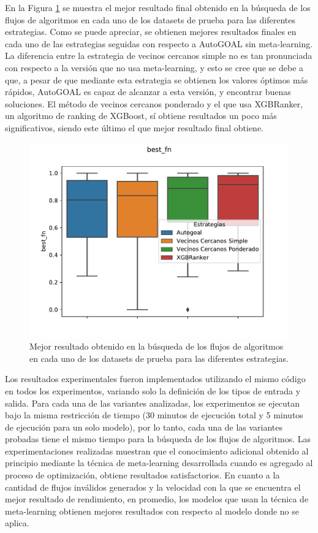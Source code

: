 En la Figura \ref{fig:bestfn} se muestra el mejor resultado final obtenido en la búsqueda de los flujos de algoritmos en cada uno de los datasets de prueba para las diferentes estrategias. Como se puede apreciar, se obtienen mejores resultados finales en cada uno de las estrategias seguidas con respecto a AutoGOAL sin meta-learning. La diferencia entre la estrategia de vecinos cercanos simple no es tan pronunciada con respecto a  la versión que no usa meta-learning, y esto se cree que se debe a que, a pesar de que mediante esta estrategia se obtienen los valores óptimos más rápidos, AutoGOAL es capaz de alcanzar a esta versión, y encontrar buenas soluciones. El método de vecinos cercanos ponderado y el que usa XGBRanker, un algoritmo de ranking de XGBoost, sí obtiene resultados un poco más significativos, siendo este último el que mejor resultado final obtiene.

\begin{figure}[H]
\centering
\includegraphics[scale=.75]{Figures/best-fn.pdf}
\caption{Mejor resultado obtenido en la búsqueda de los flujos de algoritmos en cada uno de los datasets de prueba para las diferentes estrategias.}
\label{fig:bestfn}
\end{figure}

Los resultados experimentales fueron implementados utilizando el mismo código en todos los experimentos, variando solo la definición de los tipos de entrada y salida. Para cada una de las variantes analizadas, los experimentos se ejecutan bajo la misma restricción de tiempo (30 minutos de ejecución total y 5 minutos de ejecución para un solo modelo), por lo tanto, cada una de las variantes probadas tiene el mismo tiempo para la búsqueda de los flujos de algoritmos. Las experimentaciones realizadas muestran que el conocimiento adicional obtenido al principio mediante la técnica de meta-learning desarrollada cuando es agregado al proceso de optimización, obtiene resultados satisfactorios. En cuanto a la cantidad de flujos inválidos generados y la velocidad con la que se encuentra el mejor resultado de rendimiento, en promedio, los modelos que usan la técnica de meta-learning obtienen mejores resultados con respecto al modelo donde no se aplica.


